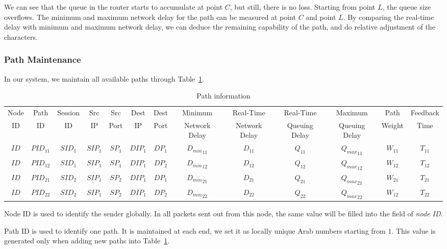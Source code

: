 We can see that the queue in the router starts to accumulate at point $C$, but still, there is no loss. Starting from point $L$, the queue size overflows. The minimum and maximum network delay for the path can be measured at point $C$ and point $L$. By comparing the real-time delay with minimum and maximum network delay, we can deduce the remaining capability of the path, and do relative adjustment of the characters.


\subsubsection{Path Maintenance}

In our system, we maintain all available paths through Table~\ref{tb.pi}.

\begin{table}
\small
\caption{\label{tb.pi}Path information}
\centering
\begin{tabular}{|c|c|c|c|c|c|c|c|c|c|c|c|c|}
\hline
Node &  Path & Session & Src &   Src & Dest & Dest &   Minimum       & Real-Time      & Real-Time      & Maximum       & Path    & Feedback\\
 ID  &   ID  & ID & IP  &  Port &  IP  & Port &  Network Delay  & Network Delay  & Queuing Delay  & Queuing Delay & Weight  & Time\\
\hline
$ID$&${PID}_{11}$&${SID}_{1}$&${SIP}_{1}$&${SP}_{1}$&${DIP}_{1}$&${DP}_{1}$&${D_{min}}_{11}$&$D_{11}$&${Q}_{11}$&${{Q}_{max}}_{11}$&$W_{11}$&$T_{11}$ \\
\hline
$ID$&${PID}_{12}$&${SID}_{1}$&${SIP}_{1}$&${SP}_{1}$&${DIP}_{1}$&${DP}_{2}$&${D_{min}}_{12}$&$D_{12}$&${Q}_{12}$&${{Q}_{max}}_{12}$&$W_{12}$&$T_{12}$ \\
\hline
$ID$&${PID}_{21}$&${SID}_{2}$&${SIP}_{1}$&${SP}_{2}$&${DIP}_{1}$&${DP}_{1}$&${D_{min}}_{21}$&$D_{21}$&${Q}_{21}$&${{Q}_{max}}_{21}$&$W_{21}$&$T_{21}$ \\
\hline
$ID$&${PID}_{22}$&${SID}_{2}$&${SIP}_{1}$&${SP}_{2}$&${DIP}_{1}$&${DP}_{2}$&${D_{min}}_{22}$&$D_{22}$&${Q}_{22}$&${{Q}_{max}}_{22}$&$W_{12}$&$T_{22}$ \\
\hline
\end{tabular}
\end{table}

Node ID is used to identify the sender globally. In all packets sent out from this node, the same value will be filled into the field of \emph{node ID}.

Path ID is used to identify one path. It is maintained at each end, we set it as locally unique Arab numbers starting from $1$. This value is generated only when adding new paths into Table~\ref{tb.pi}. 

